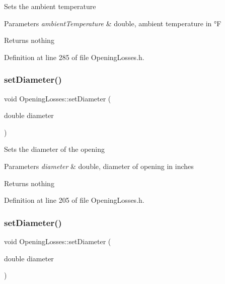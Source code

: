 Sets the ambient temperature


\begin{DoxyParams}{Parameters}
{\em ambient\+Temperature} & double, ambient temperature in °F\\
\hline
\end{DoxyParams}
\begin{DoxyReturn}{Returns}
nothing 
\end{DoxyReturn}


Definition at line 285 of file Opening\+Losses.\+h.

\mbox{\label{class_opening_losses_ab840ba51788e83c0b1dc9b8c05b1eadb}} 
\subsubsection{\texorpdfstring{set\+Diameter()}{setDiameter()}\hspace{0.1cm}{\footnotesize\ttfamily [1/3]}}
{\footnotesize\ttfamily void Opening\+Losses\+::set\+Diameter (\begin{DoxyParamCaption}\item[{double}]{diameter }\end{DoxyParamCaption})\hspace{0.3cm}{\ttfamily [inline]}}

Sets the diameter of the opening


\begin{DoxyParams}{Parameters}
{\em diameter} & double, diameter of opening in inches\\
\hline
\end{DoxyParams}
\begin{DoxyReturn}{Returns}
nothing 
\end{DoxyReturn}


Definition at line 205 of file Opening\+Losses.\+h.

\mbox{\label{class_opening_losses_ab840ba51788e83c0b1dc9b8c05b1eadb}} 
\subsubsection{\texorpdfstring{set\+Diameter()}{setDiameter()}\hspace{0.1cm}{\footnotesize\ttfamily [2/3]}}
{\footnotesize\ttfamily void Opening\+Losses\+::set\+Diameter (\begin{DoxyParamCaption}\item[{double}]{diameter }\end{DoxyParamCaption})\hspace{0.3cm}{\ttfamily [inline]}}

